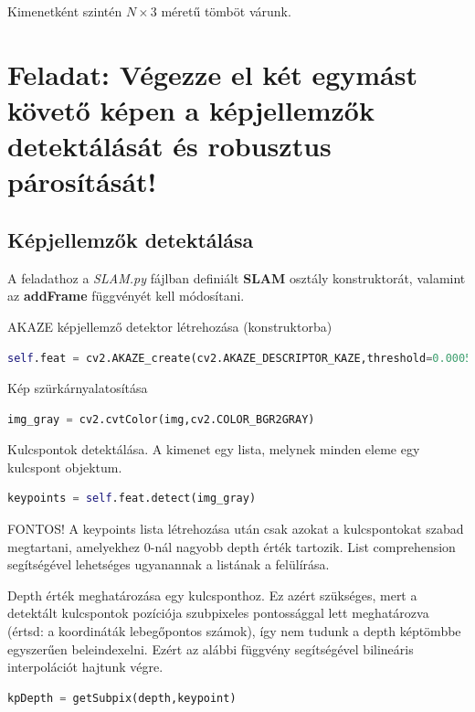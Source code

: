 \documentclass[12pt,a4paper,oneside]{report}             %
\begin{document}
Kimenetként szintén $N\times 3$ méretű tömböt várunk.

\section{Feladat: Végezze el két egymást követő képen a képjellemzők detektálását és robusztus párosítását!}

\subsection{Képjellemzők detektálása}

A feladathoz a \emph{SLAM.py} fájlban definiált \textbf{SLAM} osztály konstruktorát, valamint az \textbf{addFrame} függvényét kell módosítani.

AKAZE képjellemző detektor létrehozása (konstruktorba)

\begin{lstlisting}[language=Python]
self.feat = cv2.AKAZE_create(cv2.AKAZE_DESCRIPTOR_KAZE,threshold=0.0005)
\end{lstlisting}

Kép szürkárnyalatosítása

\begin{lstlisting}[language=Python]
img_gray = cv2.cvtColor(img,cv2.COLOR_BGR2GRAY)
\end{lstlisting}

Kulcspontok detektálása. A kimenet egy lista, melynek minden eleme egy kulcspont objektum.

\begin{lstlisting}[language=Python]
keypoints = self.feat.detect(img_gray)
\end{lstlisting}

FONTOS! A keypoints lista létrehozása után csak azokat a kulcspontokat szabad megtartani, amelyekhez $0$-nál nagyobb depth érték tartozik. List comprehension segítségével lehetséges ugyanannak a listának a felülírása.

Depth érték meghatározása egy kulcsponthoz. Ez azért szükséges, mert a detektált kulcspontok pozíciója szubpixeles pontossággal lett meghatározva (értsd: a koordináták lebegőpontos számok), így nem tudunk a depth képtömbbe egyszerűen beleindexelni. Ezért az alábbi függvény segítségével bilineáris interpolációt hajtunk végre.

\begin{lstlisting}[language=Python]
kpDepth = getSubpix(depth,keypoint)
\end{lstlisting}
\end{document}
